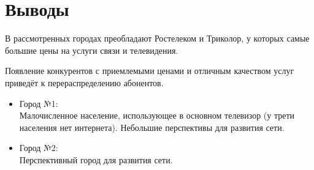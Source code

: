 \documentclass[unicode, 12pt, a4paper,oneside,fleqn]{article}
\begin{document}
\section{Выводы}
В рассмотренных городах преобладают Ростелеком и Триколор, у которых
самые большие цены на услуги связи и телевидения.

Появление конкурентов с приемлемыми ценами и отличным качеством услуг
приведёт к перераспределению абонентов.

  \begin{itemize}
  \item Город №1:\\
    Малочисленное население, использующее в основном телевизор (у трети населения нет интернета).
    Небольшие перспективы для развития сети.
  \item Город №2:\\
    Перспективный город для развития сети.
  \end{itemize}
\end{document}
